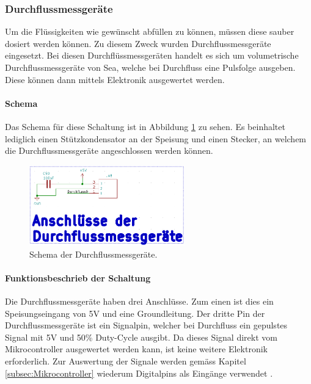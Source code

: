 \subsubsection{Durchflussmessgeräte}
\label{subsubsec:Durchflussmessgeraete}

Um die Flüssigkeiten wie gewünscht abfüllen zu können, müssen diese sauber dosiert werden können. Zu diesem Zweck wurden Durchflussmessgeräte eingesetzt. Bei diesen Durchflüssmessgeräten handelt es sich um volumetrische Durchflussmessgeräte von Sea, welche bei Durchfluss eine Pulsfolge ausgeben. Diese können dann mittels Elektronik ausgewertet werden. \cite{five__tools_store_us_nodate}

\paragraph{Schema}\mbox{}

Das Schema für diese Schaltung ist in Abbildung \ref{fig:Schema_Durchflussmessgeräte} zu sehen. Es beinhaltet lediglich einen Stützkondensator an der Speisung und einen Stecker, an welchem die Durchflussmessgeräte angeschlossen werden können.

\begin{figure}[h!]
	\centering
	\includegraphics[width=0.6\textwidth]{graphics/Schema_Durchflussmessgeraete.png}
	\caption{Schema der Durchflussmessgeräte.}
	\label{fig:Schema_Durchflussmessgeräte}
\end{figure}

\paragraph{Funktionsbeschrieb der Schaltung}\mbox{}

Die Durchflussmessgeräte haben drei Anschlüsse. Zum einen ist dies ein Speisungseingang von 5V und eine Groundleitung. Der dritte Pin der Durchflussmessgeräte ist ein Signalpin, welcher bei Durchfluss ein gepulstes Signal mit 5V und 50\% Duty-Cycle ausgibt. Da dieses Signal direkt vom Mikrocontroller ausgewertet werden kann, ist keine weitere Elektronik erforderlich. Zur Auswertung der Signale werden gemäss Kapitel \ref{subsec:Mikrocontroller} wiederum Digitalpins als Eingänge verwendet \cite{five__tools_store_us_nodate}. 
